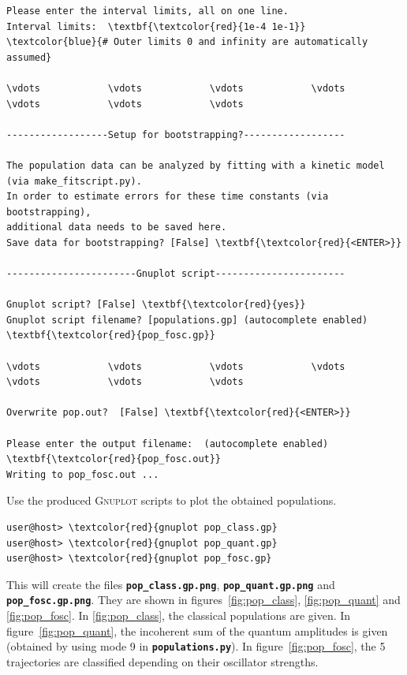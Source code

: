 \documentclass[a4paper,11pt,DIV=15,openany]{scrbook}
\newcommand{\ttt}[1]{\textbf{\texttt{#1}}}
\begin{document}
\begin{oframed}
\begin{Verbatim}[commandchars=\\\{\}]
Please enter the interval limits, all on one line.
Interval limits:  \textbf{\textcolor{red}{1e-4 1e-1}}          \textcolor{blue}{# Outer limits 0 and infinity are automatically assumed}

\vdots            \vdots            \vdots            \vdots            \vdots            \vdots            \vdots            

------------------Setup for bootstrapping?------------------

The population data can be analyzed by fitting with a kinetic model (via make_fitscript.py). 
In order to estimate errors for these time constants (via bootstrapping), 
additional data needs to be saved here.
Save data for bootstrapping? [False] \textbf{\textcolor{red}{<ENTER>}}

-----------------------Gnuplot script-----------------------

Gnuplot script? [False] \textbf{\textcolor{red}{yes}}
Gnuplot script filename? [populations.gp] (autocomplete enabled) \textbf{\textcolor{red}{pop_fosc.gp}}

\vdots            \vdots            \vdots            \vdots            \vdots            \vdots            \vdots            

Overwrite pop.out?  [False] \textbf{\textcolor{red}{<ENTER>}}

Please enter the output filename:  (autocomplete enabled) \textbf{\textcolor{red}{pop_fosc.out}}
Writing to pop_fosc.out ...
\end{Verbatim}
\end{oframed}

\normalsize
Use the produced \textsc{Gnuplot} scripts to plot the obtained populations.
\begin{Verbatim}[commandchars=\\\{\}]
user@host> \textcolor{red}{gnuplot pop_class.gp}
user@host> \textcolor{red}{gnuplot pop_quant.gp}
user@host> \textcolor{red}{gnuplot pop_fosc.gp}
\end{Verbatim}

This will create the files \ttt{pop\_class.gp.png}, \ttt{pop\_quant.gp.png} and \ttt{pop\_fosc.gp.png}. They are shown in figures~\ref{fig:pop_class}, \ref{fig:pop_quant} and \ref{fig:pop_fosc}. 
In \ref{fig:pop_class}, the classical populations are given. 
In figure~\ref{fig:pop_quant}, the incoherent sum of the quantum amplitudes is given (obtained by using mode 9 in \ttt{populations.py}).
In figure~\ref{fig:pop_fosc}, the 5 trajectories are classified depending on their oscillator strengths.
\end{document}

